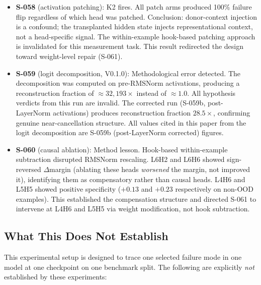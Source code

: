 \begin{itemize}
  \item \textbf{S-058} (activation patching): K2 fires. All patch arms produced
    100\% failure flip regardless of which head was patched. Conclusion: donor-context
    injection is a confound; the transplanted hidden state injects representational
    context, not a head-specific signal. The within-example hook-based patching
    approach is invalidated for this measurement task.
    This result redirected the design toward weight-level repair (S-061).

  \item \textbf{S-059} (logit decomposition, V0.1.0): Methodological error detected.
    The decomposition was computed on pre-RMSNorm activations, producing a
    reconstruction fraction of ${\approx}32{,}193\times$ instead of ${\approx}1.0$.
    All hypothesis verdicts from this run are invalid. The corrected run (S-059b,
    post-LayerNorm activations) produces reconstruction fraction $28.5\times$,
    confirming genuine near-cancellation structure.
    All values cited in this paper from the logit decomposition are S-059b
    (post-LayerNorm corrected) figures.

  \item \textbf{S-060} (causal ablation): Method lesson. Hook-based within-example
    subtraction disrupted RMSNorm rescaling. L6H2 and L6H6 showed sign-reversed
    $\Delta$margin (ablating these heads \emph{worsened} the margin, not improved it),
    identifying them as compensatory rather than causal heads. L4H6 and L5H5 showed
    positive specificity ($+0.13$ and $+0.23$ respectively on non-OOD examples).
    This established the compensation structure and directed S-061 to intervene at
    L4H6 and L5H5 via weight modification, not hook subtraction.
\end{itemize}

\subsection{What This Does Not Establish}

This experimental setup is designed to trace one selected failure mode in one model
at one checkpoint on one benchmark split.
The following are explicitly \emph{not} established by these experiments:

